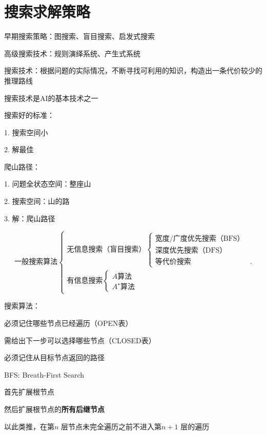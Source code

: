 \section{搜索求解策略}%
\label{sec:搜索求解策略}
\begin{notation}
    早期搜索策略：图搜索、盲目搜索、启发式搜索

    高级搜索技术：规则演绎系统、产生式系统
\end{notation}
\begin{defi}
    搜索技术：根据问题的实际情况，不断寻找可利用的知识，构造出一条代价较少的推理路线

    搜索技术是AI的基本技术之一
\end{defi}
搜索好的标准：

1. 搜索空间小

2. 解最佳
\begin{eg}
    爬山路径：

    1. 问题全状态空间：整座山

    2. 搜索空间：山的路

    3. 解：爬山路径
\end{eg}
\[
    \text{一般搜索算法}
    \begin{cases}
        \text{无信息搜索（盲目搜索）}\begin{cases}
            \text{宽度/广度优先搜索（BFS）}\\
            \text{深度优先搜索（DFS）}\\
            \text{等代价搜索}
        \end{cases}\\
        \text{有信息搜索}\begin{cases}
            A\text{算法}\\
            A^\star\text{算法}
        \end{cases}
    \end{cases}
.\] 
\begin{notation}
    搜索算法：

    必须记住哪些节点已经遍历（OPEN表）

    需给出下一步可以选择哪些节点（CLOSED表）

    必须记住从目标节点返回的路径
\end{notation}
\begin{notation}
    BFS: Breath-First Search

    首先扩展根节点

    然后扩展根节点的\textbf{所有后继节点}

    以此类推，在第$n$ 层节点未完全遍历之前不进入第$n+1$ 层的遍历
\end{notation}

